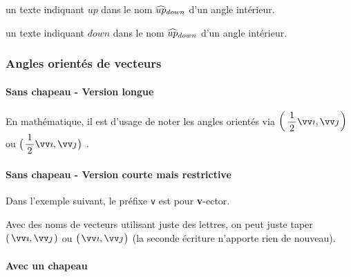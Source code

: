 \documentclass[12pt,a4paper]{article}
\theoremstyle{definition}
\begin{document}
\bigskip



 un texte indiquant $up$ dans le nom $\anglein*{up}{down}$ d'un angle intérieur.

 un texte indiquant $down$ dans le nom $\anglein*{up}{down}$ d'un angle intérieur.






		\subsubsection{Angles orientés de vecteurs}

\paragraph{Sans chapeau - Version longue}

\begin{tcblisting}{}
En mathématique, il est d'usage de noter les angles orientés via
$\displaystyle \angleorient{\frac{1}{2} \vect{i}}{\vect{j}}$
ou
$\displaystyle \angleorient*{\frac{1}{2} \vect{i}}{\vect{j}}$ .
\end{tcblisting}



\paragraph{Sans chapeau - Version courte mais restrictive}

Dans l'exemple suivant, le préfixe \verb+v+ est pour \textbf{v}-ector.
\begin{tcblisting}{}
Avec des noms de vecteurs utilisant juste des lettres, on peut juste taper
$\displaystyle \vangleorient{i}{j}$
ou
$\displaystyle \vangleorient*{i}{j}$ (la seconde écriture n'apporte rien de nouveau).
\end{tcblisting}



\paragraph{Avec un chapeau}
\end{document}
